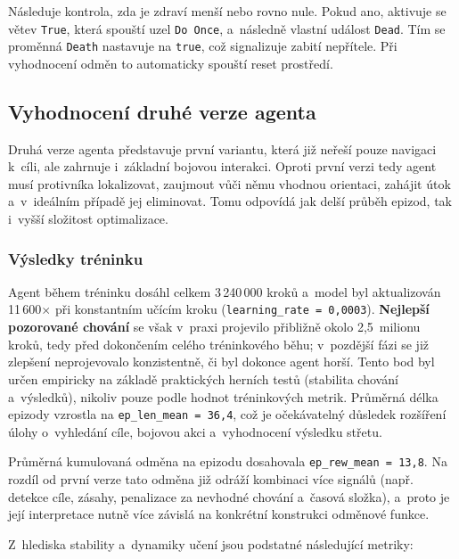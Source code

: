 Následuje kontrola, zda je zdraví menší nebo rovno nule. Pokud ano, aktivuje se větev \texttt{True}, která spouští uzel \texttt{Do Once}, a~následně vlastní událost \texttt{Dead}. Tím se proměnná \texttt{Death} nastavuje na \texttt{true}, což signalizuje zabití nepřítele. Při vyhodnocení odměn to automaticky spouští reset prostředí.

\newpage

\subsection{Vyhodnocení druhé verze agenta}

Druhá verze agenta představuje první variantu, která již neřeší pouze navigaci k~cíli, ale zahrnuje i~základní bojovou interakci. Oproti první verzi tedy agent musí protivníka lokalizovat, zaujmout vůči němu vhodnou orientaci, zahájit útok a~v~ideálním případě jej eliminovat. Tomu odpovídá jak delší průběh epizod, tak i~vyšší složitost optimalizace.

\subsubsection{Výsledky tréninku}

Agent během tréninku dosáhl celkem 3\,240\,000 kroků a~model byl aktualizován 11\,600$\times$ při konstantním učícím kroku (\texttt{learning\_rate = 0{,}0003}). \textbf{Nejlepší pozorované chování} se však v~praxi projevilo přibližně okolo 2{,}5~milionu kroků, tedy před dokončením celého tréninkového běhu; v~pozdější fázi se již zlepšení neprojevovalo konzistentně, či byl dokonce agent horší. Tento bod byl určen empiricky na základě praktických herních testů (stabilita chování a~výsledků), nikoliv pouze podle hodnot tréninkových metrik. Průměrná délka epizody vzrostla na \texttt{ep\_len\_mean = 36{,}4}, což je očekávatelný důsledek rozšíření úlohy o~vyhledání cíle, bojovou akci a~vyhodnocení výsledku střetu.

Průměrná kumulovaná odměna na epizodu dosahovala \texttt{ep\_rew\_mean = 13{,}8}. Na rozdíl od první verze tato odměna již odráží kombinaci více signálů (např. detekce cíle, zásahy, penalizace za nevhodné chování a~časová složka), a~proto je její interpretace nutně více závislá na konkrétní konstrukci odměnové funkce.

Z~hlediska stability a~dynamiky učení jsou podstatné následující metriky:

